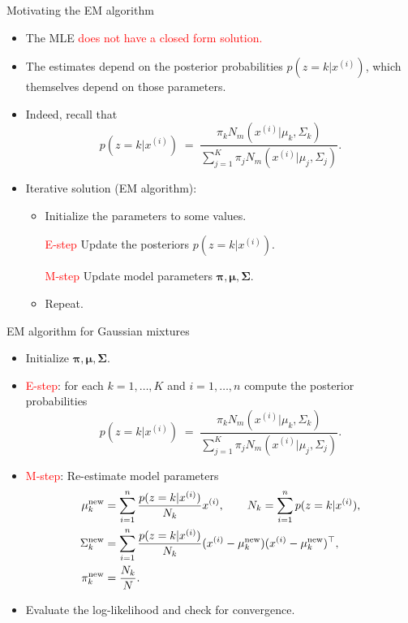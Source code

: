 \documentclass[11pt,handout,aspectratio=169]{beamer}
\begin{document}
\begin{frame}{Motivating the EM algorithm}
\begin{itemize}
	\item The MLE \textcolor{red}{does not have a closed form solution.}
	\item The estimates depend on the posterior probabilities $p(z=k|x^{(i)})$, which themselves depend on those parameters.
	\item Indeed, recall that $$p(z=k|x^{(i)})\;=\;\frac{\pi_k N_m(x^{(i)}|\mu_k,\Sigma_k)}{\sum_{j=1}^K \pi_j N_m(x^{(i)}|\mu_j,\Sigma_j)}.
$$
\item Iterative solution (EM algorithm):
\begin{itemize}
\item Initialize the parameters to some values.
\item [\textcolor{red}{E-step}] Update the posteriors $p(z=k|x^{(i)})$.
\item [\textcolor{red}{M-step}] Update model parameters $\boldsymbol\pi,\boldsymbol\mu,\boldsymbol\Sigma$.
\item Repeat.
\end{itemize}
\end{itemize}
\end{frame}


\begin{frame}[label=GMEM]{EM algorithm for Gaussian mixtures}
	\begin{itemize}
		\item Initialize $\boldsymbol\pi,\boldsymbol\mu,\boldsymbol\Sigma$.
		\item \textcolor{red}{E-step}: for each $k=1,\ldots,K$ and $i=1,\ldots,n$  compute the posterior probabilities $$p(z=k|x^{(i)})\;=\;\frac{\pi_k N_m(x^{(i)}|\mu_k,\Sigma_k)}{\sum_{j=1}^K \pi_j N_m(x^{(i)}|\mu_j,\Sigma_j)}.$$
		\item \textcolor{red}{M-step}: Re-estimate model parameters
		\begin{align*}
			\mu_k^{\rm new} & =\sum_{i=1}^n \frac{p(z=k|x^{(i)})}{N_k}x^{(i)},\qquad N_k=\sum_{i=1}^n p(z=k|x^{(i)}),\\
			\Sigma_k^{\rm new} & = \sum_{i=1}^n \frac{p(z=k|x^{(i)})}{N_k}(x^{(i)}-\mu_k^{\rm new})(x^{(i)}-\mu_k^{\rm new})^\top,\\
			\pi_k^{\rm new} & = \frac{N_k}{N}.
		\end{align*}
		\item Evaluate the log-likelihood and check for convergence. 
	\end{itemize}
\end{frame}
\end{document}
